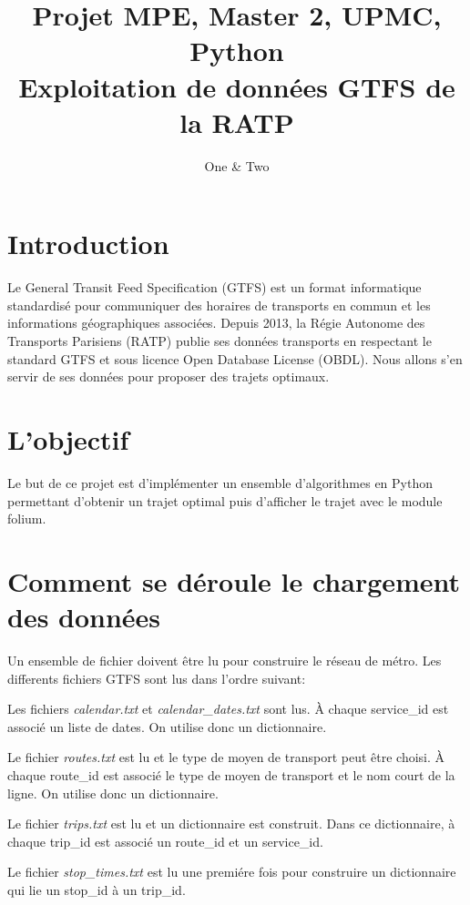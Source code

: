 \documentclass[a4paper, 12pt]{article}
\title{
Projet MPE, Master 2, UPMC, Python \\
Exploitation de donn\'ees GTFS de la RATP
}
\author{One \& Two}
\begin{document}
\maketitle
{}
\newpage
\protect\hypertarget{table}{}
\renewcommand{\contentsname}{Sommaire}
\tableofcontents
\newpage
\newpage
{}
\setcounter{page}{3}

\section{Introduction}
Le General Transit Feed Specification (GTFS)\cite{GTFS} est un format
 informatique
 standardis\'e pour communiquer des horaires de transports en commun et les
 informations géographiques associées. Depuis 2013, la R\'egie Autonome des
 Transports Parisiens (RATP) publie ses donn\'ees transports en respectant le
 standard GTFS et sous licence Open Database License (OBDL)\cite{RATP}. Nous allons s'en
 servir de ses donn\'ees pour proposer des trajets optimaux.

\section{L'objectif}
Le but de ce projet est d'impl\'ementer un ensemble d'algorithmes en Python
 permettant d'obtenir un trajet optimal puis d'afficher le trajet avec le module
 folium\cite{folium}.

\section{Comment se d\'eroule le chargement des donn\'ees}
Un ensemble de fichier doivent \^etre lu pour construire le r\'eseau de m\'etro.
Les differents fichiers GTFS sont lus dans l'ordre suivant:

Les fichiers \textit{calendar.txt} et \textit{calendar\_dates.txt}
 sont lus. \`A chaque service\_id est associ\'e un liste de dates. On utilise
 donc un dictionnaire.

Le fichier \textit{routes.txt} est lu et le type de moyen de transport peut
 \^etre choisi. \`A chaque route\_id est associ\'e le type de moyen de transport
 et le nom court de la ligne. On utilise donc un dictionnaire.

Le fichier \textit{trips.txt} est lu et un dictionnaire est construit. Dans ce
 dictionnaire, \`a chaque trip\_id est associ\'e un route\_id et un service\_id.

Le fichier \textit{stop\_times.txt} est lu une premi\'ere fois pour construire
 un dictionnaire qui lie un stop\_id \`a un trip\_id.
\end{document}
